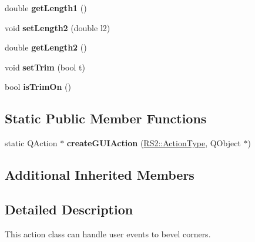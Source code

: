 \begin{DoxyCompactItemize}
\item 
\hypertarget{classRS__ActionModifyBevel_a76052e90220cabf4224cefdecaa37126}{double {\bfseries get\-Length1} ()}\label{classRS__ActionModifyBevel_a76052e90220cabf4224cefdecaa37126}

\item 
\hypertarget{classRS__ActionModifyBevel_ae6bbc87708b4a59a3f788119022f0237}{void {\bfseries set\-Length2} (double l2)}\label{classRS__ActionModifyBevel_ae6bbc87708b4a59a3f788119022f0237}

\item 
\hypertarget{classRS__ActionModifyBevel_a4ff4464f2b3581959a2a970267f61cbd}{double {\bfseries get\-Length2} ()}\label{classRS__ActionModifyBevel_a4ff4464f2b3581959a2a970267f61cbd}

\item 
\hypertarget{classRS__ActionModifyBevel_a44a2f7ed8de2f4bff825e110e8a39ff9}{void {\bfseries set\-Trim} (bool t)}\label{classRS__ActionModifyBevel_a44a2f7ed8de2f4bff825e110e8a39ff9}

\item 
\hypertarget{classRS__ActionModifyBevel_a18279cd7c2d020e2ab808c4ce8d04880}{bool {\bfseries is\-Trim\-On} ()}\label{classRS__ActionModifyBevel_a18279cd7c2d020e2ab808c4ce8d04880}

\end{DoxyCompactItemize}
\subsection*{Static Public Member Functions}
\begin{DoxyCompactItemize}
\item 
\hypertarget{classRS__ActionModifyBevel_a960e642a3a0e82c30800e3e091596f15}{static Q\-Action $\ast$ {\bfseries create\-G\-U\-I\-Action} (\hyperlink{classRS2_afe3523e0bc41fd637b892321cfc4b9d7}{R\-S2\-::\-Action\-Type}, Q\-Object $\ast$)}\label{classRS__ActionModifyBevel_a960e642a3a0e82c30800e3e091596f15}

\end{DoxyCompactItemize}
\subsection*{Additional Inherited Members}


\subsection{Detailed Description}
This action class can handle user events to bevel corners.

